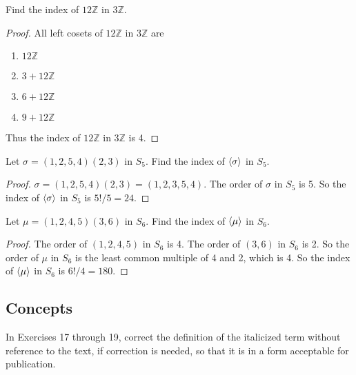 \newpage
\begin{exercise}
    Find the index of $12\mathbb{Z}$ in $3\mathbb{Z}$.
\end{exercise}

\begin{proof}
    All left cosets of $12\mathbb{Z}$ in $3\mathbb{Z}$ are
    \begin{enumerate}[label={(\arabic*)}]
        \item $12\mathbb{Z}$
        \item $3 + 12\mathbb{Z}$
        \item $6 + 12\mathbb{Z}$
        \item $9 + 12\mathbb{Z}$
    \end{enumerate}

    Thus the index of $12\mathbb{Z}$ in $3\mathbb{Z}$ is 4.
\end{proof}

\newpage
\begin{exercise}
    Let $\sigma = (1,2,5,4)(2,3)$ in $S_{5}$. Find the index of $\left\langle{\sigma}\right\rangle$ in $S_{5}$.
\end{exercise}

\begin{proof}
    $\sigma = (1,2,5,4)(2,3) = (1,2,3,5,4)$. The order of $\sigma$ in $S_{5}$ is 5. So the index of $\left\langle{\sigma}\right\rangle$ in $S_{5}$ is $5!/5 = 24$.
\end{proof}

\newpage
\begin{exercise}
    Let $\mu = (1,2,4,5)(3,6)$ in $S_{6}$. Find the index of $\left\langle{\mu}\right\rangle$ in $S_{6}$.
\end{exercise}

\begin{proof}
    The order of $(1,2,4,5)$ in $S_{6}$ is 4. The order of $(3,6)$ in $S_{6}$ is 2. So the order of $\mu$ in $S_{6}$ is the least common multiple of 4 and 2, which is 4. So the index of $\left\langle{\mu}\right\rangle$ in $S_{6}$ is $6!/4 = 180$.
\end{proof}

\subsection*{Concepts}

In Exercises 17 through 19, correct the definition of the italicized term without reference to the text, if correction is needed, so that it is in a form acceptable for publication.

